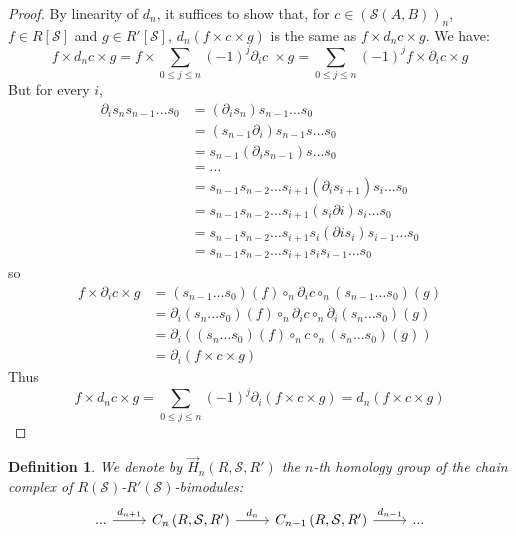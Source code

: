 \documentclass[a4paper,fleqn]{cas-sc}
\newtheorem{dfnt}{Definition}%
\newcommand{\G}{\Vec{H}}
\newcommand{\cS}{{\mathcal{S}}}
\begin{document}
\begin{proof}
By linearity of $d_n$, it suffices to show that, for $c \in (\cS (A,B))_n$, $f \in R[\cS]$ and $g \in R'[\cS]$,  $d_n \left( f \times c \times g \right)$ is the same as $f \times d_n c \times g$. We have:
\[
f \times d_n c \times g = 
f \times  \sum_{0 \leq j \leq n} {(-1)}^j  \partial_i c  \; \times g =
\sum_{0 \leq j \leq n} {(-1)}^j f \times \partial_i c  \times g\]
\noindent But for every $i$,
\begin{align*}
\partial_i s_n s_{n-1} \dots s_0 &=
(\partial_i s_n) s_{n-1} \dots s_0 \\
&= (s_{n-1} \partial_i) s_{n-1}  s\dots s_0\\
&= s_{n-1} (\partial_i s_{n-1})  s\dots s_0\\
&= \dots \\
&= s_{n-1} s_{n-2} \dots s_{i+1} (\partial_i s_{i+1}) s_i \dots s_0 \\
&= s_{n-1} s_{n-2} \dots s_{i+1} (s_i \partial i) s_i \dots s_0 \\
&= s_{n-1} s_{n-2} \dots s_{i+1} s_i (\partial i s_i) s_{i-1} \dots s_0 \\
&= s_{n-1} s_{n-2} \dots s_{i+1} s_i s_{i-1} \dots s_0
\end{align*}
\noindent so 
\begin{align*}
f \times \partial_i c  \times g &= 
(s_{n-1} \dots s_0)(f) \circ_n \partial_i c \circ_n (s_{n-1} \dots s_0)(g)\\
&= \partial_i (s_n \dots s_0)(f) \circ_n \partial_i c \circ_n \partial_i (s_n \dots s_0)(g) \\
&= \partial_i \left( 
 (s_n \dots s_0)(f) \circ_n  c \circ_n  (s_n \dots s_0)(g)
\right)\\
&= \partial_i ( f \times c \times g)
\end{align*}
Thus
\[
f \times d_n c \times g = \sum_{0 \leq j \leq n} {(-1)}^j \partial_i \left( f \times c \times g \right)  = d_n \left( f \times c \times g \right) \]
\end{proof}

\begin{dfnt}
We denote by $\G_n (R, \cS, R')$ the $n$-th homology group of the chain complex of $R(\cS)$-$R'(\cS)$-bimodules:
\[\begin{tikzcd}
	{...} & C_n \left( R, \cS, R'\right) & C_{n-1} \left( R, \cS, R'\right) & {...}
	\arrow["{d_{n+1}}", from=1-1, to=1-2]
	\arrow["{d_n}", from=1-2, to=1-3]
	\arrow["{d_{n-1}}", from=1-3, to=1-4]
\end{tikzcd}\]
\end{dfnt}
\end{document}
